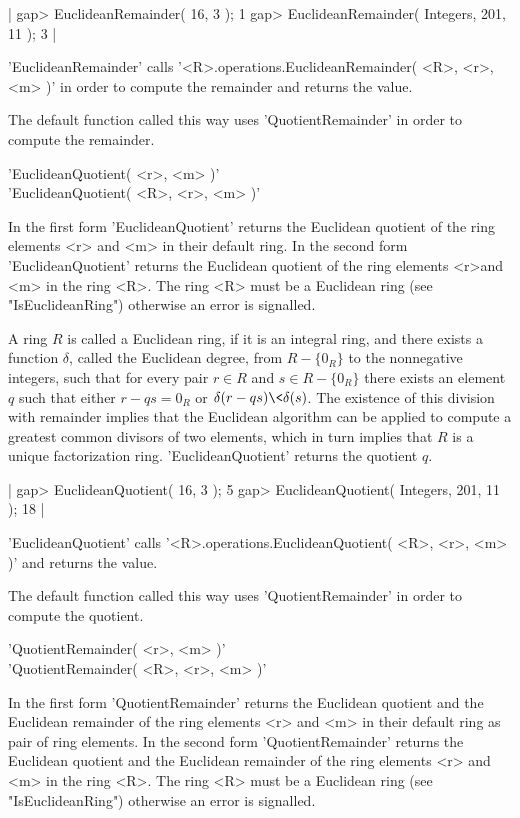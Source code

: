 |    gap> EuclideanRemainder( 16, 3 );          
    1
    gap> EuclideanRemainder( Integers, 201, 11 );
    3 |

'EuclideanRemainder' calls  '<R>.operations.EuclideanRemainder( <R>, <r>,
<m> )' in order to compute the remainder and returns the value.

The default function called this way uses 'QuotientRemainder' in order to
compute the remainder.


'EuclideanQuotient( <r>, <m> )' \\
'EuclideanQuotient( <R>, <r>, <m> )'

In the first form 'EuclideanQuotient'  returns the Euclidean quotient  of
the ring elements <r> and <m> in their default ring.  In the  second form
'EuclideanQuotient'  returns the Euclidean quotient  of the ring elements
<r>and <m> in  the ring  <R>.  The ring <R> must be a Euclidean ring (see
"IsEuclideanRing") otherwise an error is signalled.

A ring $R$ is  called  a  Euclidean ring, if it  is an integral ring, and
there exists  a function  $\delta$, called  the  Euclidean  degree,  from
$R-\{0_R\}$  to the nonnegative integers, such that for every pair $r \in
R$ and $s \in R-\{0_R\}$ there exists an element $q$  such that either $r
- q s = 0_R$ or $\delta(r - q s) \< \delta(  s )$.  The existence of this
division  with remainder implies  that  the  Euclidean  algorithm can  be
applied to compute a greatest common  divisors of two  elements, which in
turn   implies   that    $R$    is    a   unique   factorization    ring.
'EuclideanQuotient' returns the quotient $q$.

|    gap> EuclideanQuotient( 16, 3 );             
    5
    gap> EuclideanQuotient( Integers, 201, 11 );
    18 |

'EuclideanQuotient'  calls  '<R>.operations.EuclideanQuotient( <R>,  <r>,
<m> )' and returns the value.

The default function called this way uses 'QuotientRemainder' in order to
compute the quotient.


'QuotientRemainder( <r>, <m> )' \\
'QuotientRemainder( <R>, <r>, <m> )'

In the first form  'QuotientRemainder' returns the Euclidean quotient and
the Euclidean remainder of the ring elements <r> and <m> in their default
ring  as pair of ring  elements.  In the  second form 'QuotientRemainder'
returns the Euclidean quotient and the  Euclidean  remainder of the  ring
elements <r> and <m> in the ring <R>.   The ring <R> must be  a Euclidean
ring (see "IsEuclideanRing") otherwise an error is signalled.

